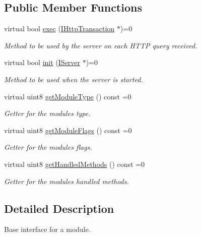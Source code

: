 \subsection*{Public Member Functions}
\begin{DoxyCompactItemize}
\item 
virtual bool \hyperlink{class_a_p_i_kachu_1_1_i_module_a594205683c6dd0af322d15d2d4557ea7}{exec} (\hyperlink{class_a_p_i_kachu_1_1_i_http_transaction}{I\+Http\+Transaction} $\ast$)=0
\begin{DoxyCompactList}\small\item\em Method to be used by the server on each H\+T\+TP query received. \end{DoxyCompactList}\item 
virtual bool \hyperlink{class_a_p_i_kachu_1_1_i_module_a7dbb157b5dd00111c9164b9fa078e151}{init} (\hyperlink{class_a_p_i_kachu_1_1_i_server}{I\+Server} $\ast$)=0
\begin{DoxyCompactList}\small\item\em Method to be used when the server is started. \end{DoxyCompactList}\item 
virtual uint8 \hyperlink{class_a_p_i_kachu_1_1_i_module_abd348ba61de8854ba4c9cf0d3b19541c}{get\+Module\+Type} () const  =0
\begin{DoxyCompactList}\small\item\em Getter for the module\textquotesingle{}s type. \end{DoxyCompactList}\item 
virtual uint8 \hyperlink{class_a_p_i_kachu_1_1_i_module_ad0ec3789fb8afa922937f8e95db8badf}{get\+Module\+Flags} () const  =0
\begin{DoxyCompactList}\small\item\em Getter for the module\textquotesingle{}s flags. \end{DoxyCompactList}\item 
virtual uint8 \hyperlink{class_a_p_i_kachu_1_1_i_module_aaad7d8817c8b1344fbe310d7e5e85404}{get\+Handled\+Methods} () const  =0
\begin{DoxyCompactList}\small\item\em Getter for the module\textquotesingle{}s handled methods. \end{DoxyCompactList}\end{DoxyCompactItemize}


\subsection{Detailed Description}
Base interface for a module. 

